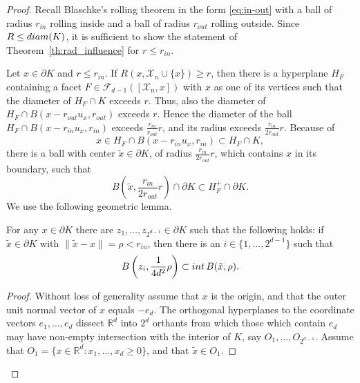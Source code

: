 \documentclass[10pt,a4paper]{amsart}
\def\R{{\mathds{R}}}
\def\bd{{\partial}}
\def\cF{{\mathcal F}}
\def\cX{{\mathcal X}}
\begin{document}
\begin{proof}
	Recall Blaschke's rolling theorem in the form \eqref{eq:in-out} with a ball of radius $r_{in}$ rolling inside and a ball of radius $r_{out}$ rolling outside. Since $R\le {\rm diam}(K)$, it is sufficient to show the statement of Theorem~\ref{th:rad_influence} for $r\le r_{in}$.

	Let $x\in \bd K$ and $r\le r_{in}$. If $R(x, \cX_n\cup \{x\}) \geq r$, then there is a hyperplane $H_F$ containing a facet $F \in \cF_{d-1}([\cX_n,x])$ with $x$ as one of its vertices such that the diameter of $H_F \cap K$ exceeds $r$. Thus, also the diameter of $H_F \cap B(x-r_{out} u_x, r_{out})$ exceeds $r$. Hence the diameter of the ball $H_F \cap B(x-r_{in} u_x, r_{in})$ exceeds $\frac{r_{in}}{r_{out}} r$, and its radius exceeds $\frac{r_{in}}{2r_{out}} r$. 
Because of
$$ x \in H_F \cap B(x-r_{in} u_x, r_{in}) \subset H_F \cap K , $$
there is a ball with center $\tilde x \in \bd K$, of radius $\frac{r_{in}}{2r_{out}} r$, which contains $x$ in its boundary, such that 
\begin{equation}\label{eq:cap_ball}
B\left(\tilde x, \frac{r_{in}}{2r_{out}} r \right) \cap \bd K \subset H_F^+ \cap \bd K 
.
\end{equation}
We use the following geometric lemma.
\begin{lemma}\label{le:points_cover}
For any $x  \in \bd K$ there are $z_1, \dots , z_{2^{d-1}} \in \bd K$ such that the following holds:
if $\tilde x \in \bd K$ with $\|\tilde x -  x\| = \rho < r_{in}$, then there is an $i \in \{1, \dots , 2^{d-1}\}$ such that 
$$ B\left(z_i, \frac 1{4d^2} \rho \right) \subset {\rm int}\, B(\tilde x, \rho) . $$ 
\end{lemma}
\begin{proof}
Without loss of generality assume that $x$ is the origin, and that the outer unit normal vector of $x$ equals $-e_d$. The orthogonal hyperplanes to the coordinate vectors $e_1, \dots, e_{d}$ dissect $\R^d$ into $2^d$ orthants from which those which contain $e_d$ may have non-empty intersection with the interior of $K$, say $O_1, \dots,  O_{2^{d-1}}$.
Assume that $O_1 = \{x \in \R^d \colon x_1, \dots, x_d \geq 0 \}$, and that $\tilde x \in O_1$. 


\end{proof}
\end{proof}
\end{document}
